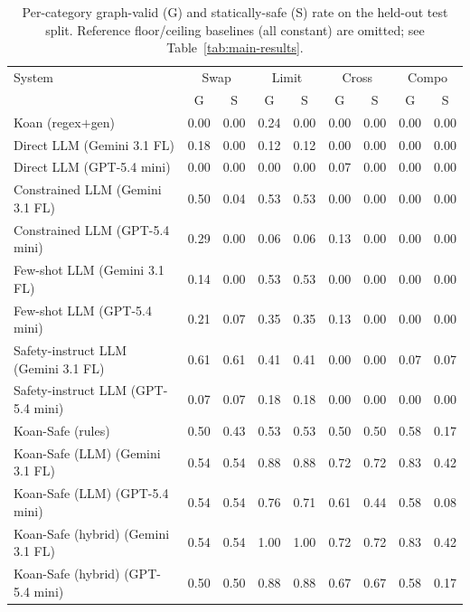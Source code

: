 \begin{table}[t]
\centering
\caption{Per-category graph-valid (G) and statically-safe (S) rate on the held-out test split. Reference floor/ceiling baselines (all constant) are omitted; see Table~\ref{tab:main-results}.}
\label{tab:per-category}
\begin{tabular}{lcccccccc}
\toprule
System & \multicolumn{2}{c}{Swap} & \multicolumn{2}{c}{Limit} & \multicolumn{2}{c}{Cross} & \multicolumn{2}{c}{Compo} \\
& G & S & G & S & G & S & G & S \\
\midrule
Koan (regex$+$gen) & 0.00 & 0.00 & 0.24 & 0.00 & 0.00 & 0.00 & 0.00 & 0.00 \\
Direct LLM (Gemini 3.1 FL) & 0.18 & 0.00 & 0.12 & 0.12 & 0.00 & 0.00 & 0.00 & 0.00 \\
Direct LLM (GPT-5.4 mini) & 0.00 & 0.00 & 0.00 & 0.00 & 0.07 & 0.00 & 0.00 & 0.00 \\
Constrained LLM (Gemini 3.1 FL) & 0.50 & 0.04 & 0.53 & 0.53 & 0.00 & 0.00 & 0.00 & 0.00 \\
Constrained LLM (GPT-5.4 mini) & 0.29 & 0.00 & 0.06 & 0.06 & 0.13 & 0.00 & 0.00 & 0.00 \\
Few-shot LLM (Gemini 3.1 FL) & 0.14 & 0.00 & 0.53 & 0.53 & 0.00 & 0.00 & 0.00 & 0.00 \\
Few-shot LLM (GPT-5.4 mini) & 0.21 & 0.07 & 0.35 & 0.35 & 0.13 & 0.00 & 0.00 & 0.00 \\
Safety-instruct LLM (Gemini 3.1 FL) & 0.61 & 0.61 & 0.41 & 0.41 & 0.00 & 0.00 & 0.07 & 0.07 \\
Safety-instruct LLM (GPT-5.4 mini) & 0.07 & 0.07 & 0.18 & 0.18 & 0.00 & 0.00 & 0.00 & 0.00 \\
Koan-Safe (rules) & 0.50 & 0.43 & 0.53 & 0.53 & 0.50 & 0.50 & 0.58 & 0.17 \\
Koan-Safe (LLM) (Gemini 3.1 FL) & 0.54 & 0.54 & 0.88 & 0.88 & 0.72 & 0.72 & 0.83 & 0.42 \\
Koan-Safe (LLM) (GPT-5.4 mini) & 0.54 & 0.54 & 0.76 & 0.71 & 0.61 & 0.44 & 0.58 & 0.08 \\
Koan-Safe (hybrid) (Gemini 3.1 FL) & 0.54 & 0.54 & 1.00 & 1.00 & 0.72 & 0.72 & 0.83 & 0.42 \\
Koan-Safe (hybrid) (GPT-5.4 mini) & 0.50 & 0.50 & 0.88 & 0.88 & 0.67 & 0.67 & 0.58 & 0.17 \\
\bottomrule
\end{tabular}
\end{table}
